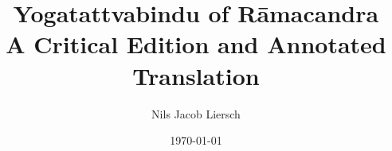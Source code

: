 %
%

\author{Nils Jacob Liersch}
\title{Yogatattvabindu of Rāmacandra\\ A Critical Edition and Annotated Translation}
\date{\today}

